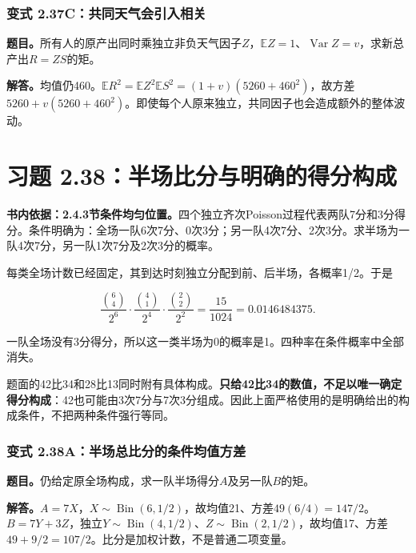 \documentclass[12pt,a4paper,UTF8,fontset=fandol]{ctexart}
\begin{document}
\subsubsection{变式
2.37C：共同天气会引入相关}\label{ux53d8ux5f0f-2.37cux5171ux540cux5929ux6c14ux4f1aux5f15ux5165ux76f8ux5173}

\textbf{题目。}所有人的原产出同时乘独立非负天气因子\(Z\)，\(\mathbb EZ=1\)、\(\operatorname{Var}Z=v\)，求新总产出\(R=ZS\)的矩。

\textbf{解答。}均值仍460。\(\mathbb ER^2=\mathbb EZ^2\mathbb ES^2=(1+v)(5260+460^2)\)，故方差\(5260+v(5260+460^2)\)。即使每个人原来独立，共同因子也会造成额外的整体波动。

\section{习题
2.38：半场比分与明确的得分构成}\label{ux4e60ux9898-2.38ux534aux573aux6bd4ux5206ux4e0eux660eux786eux7684ux5f97ux5206ux6784ux6210}

\textbf{书内依据：2.4.3节条件均匀位置。}四个独立齐次Poisson过程代表两队7分和3分得分。条件明确为：全场一队6次7分、0次3分；另一队4次7分、2次3分。求半场为一队4次7分，另一队1次7分及2次3分的概率。

每类全场计数已经固定，其到达时刻独立分配到前、后半场，各概率1/2。于是

\[
\boxed{
\frac{\binom64}{2^6}\cdot
\frac{\binom41}{2^4}\cdot
\frac{\binom22}{2^2}
=\frac{15}{1024}=0.0146484375.
}
\]

一队全场没有3分得分，所以这一类半场为0的概率是1。四种率在条件概率中全部消失。

题面的42比34和28比13同时附有具体构成。\textbf{只给42比34的数值，不足以唯一确定得分构成}：42也可能由3次7分与7次3分组成。因此上面严格使用的是明确给出的构成条件，不把两种条件强行等同。

\subsubsection{变式
2.38A：半场总比分的条件均值方差}\label{ux53d8ux5f0f-2.38aux534aux573aux603bux6bd4ux5206ux7684ux6761ux4ef6ux5747ux503cux65b9ux5dee}

\textbf{题目。}仍给定原全场构成，求一队半场得分\(A\)及另一队\(B\)的矩。

\textbf{解答。}\(A=7X\)，\(X\sim\operatorname{Bin}(6,1/2)\)，故均值21、方差\(49(6/4)=147/2\)。\(B=7Y+3Z\)，独立\(Y\sim\operatorname{Bin}(4,1/2)\)、\(Z\sim\operatorname{Bin}(2,1/2)\)，故均值17、方差\(49+9/2=107/2\)。比分是加权计数，不是普通二项变量。
\end{document}

